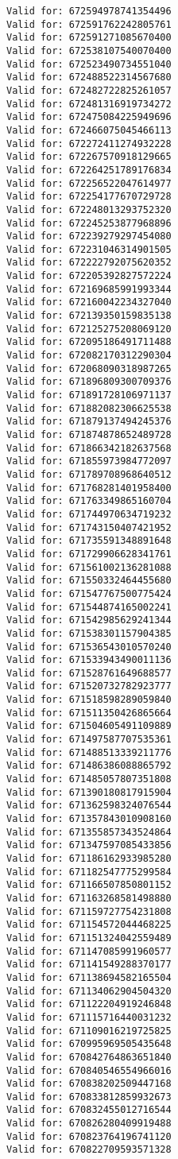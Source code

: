 \documentclass[11pt]{article}
\begin{document}
\begin{Verbatim}[commandchars=\\\{\}]
Valid for: 672594978741354496
Valid for: 672591762242805761
Valid for: 672591271085670400
Valid for: 672538107540070400
Valid for: 672523490734551040
Valid for: 672488522314567680
Valid for: 672482722825261057
Valid for: 672481316919734272
Valid for: 672475084225949696
Valid for: 672466075045466113
Valid for: 672272411274932228
Valid for: 672267570918129665
Valid for: 672264251789176834
Valid for: 672256522047614977
Valid for: 672254177670729728
Valid for: 672248013293752320
Valid for: 672245253877968896
Valid for: 672239279297454080
Valid for: 672231046314901505
Valid for: 672222792075620352
Valid for: 672205392827572224
Valid for: 672169685991993344
Valid for: 672160042234327040
Valid for: 672139350159835138
Valid for: 672125275208069120
Valid for: 672095186491711488
Valid for: 672082170312290304
Valid for: 672068090318987265
Valid for: 671896809300709376
Valid for: 671891728106971137
Valid for: 671882082306625538
Valid for: 671879137494245376
Valid for: 671874878652489728
Valid for: 671866342182637568
Valid for: 671855973984772097
Valid for: 671789708968640512
Valid for: 671768281401958400
Valid for: 671763349865160704
Valid for: 671744970634719232
Valid for: 671743150407421952
Valid for: 671735591348891648
Valid for: 671729906628341761
Valid for: 671561002136281088
Valid for: 671550332464455680
Valid for: 671547767500775424
Valid for: 671544874165002241
Valid for: 671542985629241344
Valid for: 671538301157904385
Valid for: 671536543010570240
Valid for: 671533943490011136
Valid for: 671528761649688577
Valid for: 671520732782923777
Valid for: 671518598289059840
Valid for: 671511350426865664
Valid for: 671504605491109889
Valid for: 671497587707535361
Valid for: 671488513339211776
Valid for: 671486386088865792
Valid for: 671485057807351808
Valid for: 671390180817915904
Valid for: 671362598324076544
Valid for: 671357843010908160
Valid for: 671355857343524864
Valid for: 671347597085433856
Valid for: 671186162933985280
Valid for: 671182547775299584
Valid for: 671166507850801152
Valid for: 671163268581498880
Valid for: 671159727754231808
Valid for: 671154572044468225
Valid for: 671151324042559489
Valid for: 671147085991960577
Valid for: 671141549288370177
Valid for: 671138694582165504
Valid for: 671134062904504320
Valid for: 671122204919246848
Valid for: 671115716440031232
Valid for: 671109016219725825
Valid for: 670995969505435648
Valid for: 670842764863651840
Valid for: 670840546554966016
Valid for: 670838202509447168
Valid for: 670833812859932673
Valid for: 670832455012716544
Valid for: 670826280409919488
Valid for: 670823764196741120
Valid for: 670822709593571328

\end{Verbatim}
\end{document}
